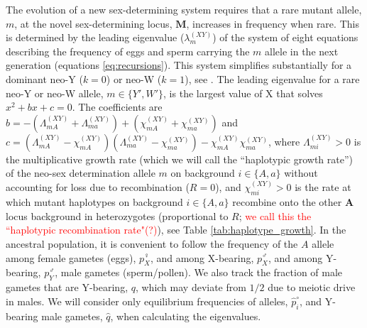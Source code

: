 \documentclass[10pt,letterpaper]{article}
\begin{document}
The evolution of a new sex-determining system requires that a rare mutant allele, $m$, at the novel sex-determining locus, $\mathbf{M}$, increases in frequency when rare. 
This is determined by the leading eigenvalue ($\lambda_m^{(XY)}$) of the system of eight equations describing the frequency of eggs and sperm carrying the $m$ allele in the next generation (equations \ref{eq:recursions}). %
This system simplifies substantially for a dominant neo-Y ($k=0$) or neo-W ($k=1$), see . 
The leading eigenvalue for a rare neo-Y or neo-W allele, $m\in\{Y',W'\}$, is the largest value of X that solves $x^2+ b x + c = 0$.  %
The coefficients are $b= - (\Lambda_{mA}^{(XY)} + \Lambda_{ma}^{(XY)})+(\chi_{mA}^{(XY)} + \chi_{ma}^{(XY)})$ and $c = (\Lambda_{mA}^{(XY)} - \chi_{mA}^{(XY)}) (\Lambda_{ma}^{(XY)} - \chi_{ma}^{(XY)}) - \chi_{mA}^{(XY)} \chi_{ma}^{(XY)}$, where $\Lambda_{mi}^{(XY)}>0$ is the multiplicative growth rate (which we will call the ``haplotypic growth rate'') of the neo-sex determination allele $m$ on background $i\in\{A,a\}$ without accounting for loss due to recombination ($R=0$), and $\chi_{mi}^{(XY)}>0$ is the rate at which mutant haplotypes on background $i\in\{A,a\}$ recombine onto the other $\mathbf{A}$ locus background in heterozygotes (proportional to $R$; \textcolor{red}{we call this the ``haplotypic recombination rate"(?)}), see Table \ref{tab:haplotype_growth}.
In the ancestral population, it is convenient to follow the frequency of the $A$ allele among female gametes (eggs), $p^\female_X$, and among X-bearing, $p^\male_X$, and among Y-bearing, $p^\male_Y$, male gametes (sperm/pollen). 
We also track the fraction of male gametes that are Y-bearing, $q$, which may deviate from $1/2$ due to meiotic drive in males. 
We will consider only equilibrium frequencies of alleles, $\hat{p}^\circ_i$, and Y-bearing male gametes, $\hat{q}$, when calculating the eigenvalues.  
\end{document}
